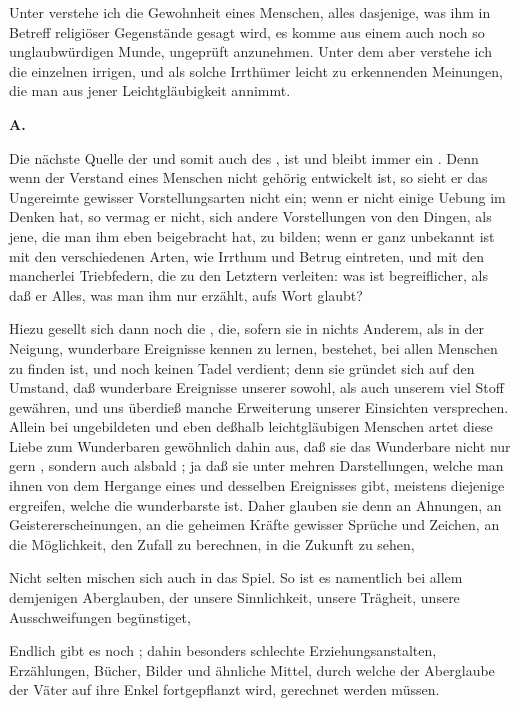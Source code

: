 Unter  verstehe ich die Gewohnheit eines Menschen, alles dasjenige, was ihm in Betreff religiöser Gegenstände gesagt wird, es komme aus einem auch noch so unglaubwürdigen Munde, ungeprüft anzunehmen. Unter dem  aber verstehe ich die einzelnen irrigen, und als solche Irrthümer leicht zu erkennenden Meinungen, die man aus jener Leichtgläubigkeit annimmt.\par

\vabst\textbf{A.} 
\begin{aufza}
\item Die nächste Quelle der  und somit auch des , ist und bleibt immer ein . Denn wenn der Verstand eines Menschen nicht gehörig entwickelt ist, so sieht er das Ungereimte gewisser Vorstellungsarten nicht ein; wenn er nicht einige Uebung im Denken hat, so vermag er nicht, sich andere Vorstellungen von den Dingen, als jene, die man ihm eben beigebracht hat, zu bilden; wenn er ganz unbekannt ist mit den verschiedenen Arten, wie Irrthum und Betrug eintreten, und mit den mancherlei Triebfedern, die zu den Letztern verleiten: was ist begreiflicher, als daß er Alles, was man ihm nur erzählt, aufs Wort glaubt?
\item Hiezu gesellt sich dann noch die , die, sofern sie in nichts Anderem, als in der Neigung, wunderbare Ereignisse kennen zu lernen, bestehet, bei allen Menschen zu finden ist, und noch keinen Tadel verdient; denn sie gründet sich auf den Umstand, daß wunderbare Ereignisse unserer  sowohl, als auch unserem  viel Stoff gewähren, und uns überdieß manche Erweiterung unserer Einsichten versprechen. Allein bei ungebildeten und eben deßhalb leichtgläubigen Menschen artet diese Liebe zum Wunderbaren gewöhnlich dahin aus, daß sie das Wunderbare nicht nur gern , sondern auch alsbald ; ja daß sie unter mehren Darstellungen, welche man ihnen von dem Hergange eines und desselben Ereignisses gibt, meistens diejenige ergreifen, welche die wunderbarste ist. Daher glauben sie denn an Ahnungen, an Geistererscheinungen, an die geheimen Kräfte gewisser Sprüche und Zeichen, an die Möglichkeit, den Zufall zu berechnen, in die Zukunft zu sehen, \udgl\
\item Nicht selten mischen sich auch  in das Spiel. So ist es namentlich bei allem demjenigen Aberglauben, der unsere Sinnlichkeit, unsere Trägheit, unsere Ausschweifungen begünstiget, \udgl\
\item Endlich gibt es noch ; dahin besonders schlechte Erziehungsanstalten, Erzählungen, Bücher, Bilder und ähnliche Mittel, durch welche der Aberglaube der Väter auf ihre Enkel fortgepflanzt wird, gerechnet werden müssen.
\end{aufza}\par
